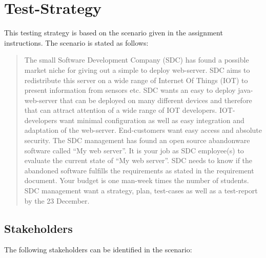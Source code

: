 %
%
%


\section{Test-Strategy}
%
%
%

This testing strategy is based on the scenario given in the assignment instructions.
The scenario \cite{2dv610:assignment2-instructions} is stated as follows:

\begin{quote}
  The small Software Development Company (SDC) has found a possible market niche
  for giving out a simple to deploy web-server. SDC aims to redistribute this
  server on a wide range of Internet Of Things (IOT) to present information
  from sensors etc. SDC wants an easy to deploy java-web-server that can be
  deployed on many different devices and therefore that can attract attention
  of a wide range of IOT developers. IOT-developers want minimal
  configuration as well as easy integration and adaptation of the web-server.
  End-customers want easy access and absolute security. The SDC management
  has found an open source abandonware software called “My web server”. It is
  your job as SDC employee(s) to evaluate the current state of “My web
  server”. SDC needs to know if the abandoned software fulfills the
  requirements as stated in the requirement document. Your budget is one
  man-week times the number of students. SDC management want a strategy,
  plan, test-cases as well as a test-report by the 23 December.
\end{quote}


\subsection{Stakeholders}
The following stakeholders can be identified in the scenario:

